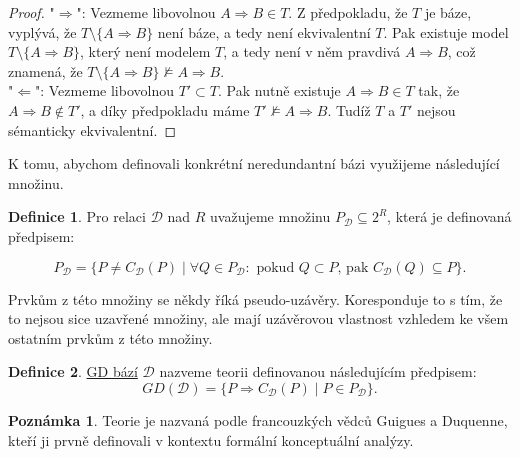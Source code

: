 \documentclass{article}
\theoremstyle {definition}
\newtheorem{definition}{Definice}
\newtheorem*{remark}{Poznámka}
\begin{document}
\begin{proof}
  "$\Rightarrow$": Vezmeme libovolnou $A \Rightarrow B \in T$. Z
  předpokladu, že $T$ je báze, vyplývá, že $T \setminus \{A
  \Rightarrow B \}$ není báze, a tedy není ekvivalentní $T$. Pak
  existuje model $T \setminus \{A \Rightarrow B \}$, který není
  modelem $T$, a tedy není v něm pravdivá $A\Rightarrow B$, což
  znamená, že $T \setminus \{A \Rightarrow B \} \not\models A
  \Rightarrow B$.\\
  
  "$\Leftarrow$": Vezmeme libovolnou $T' \subset T$. Pak nutně
  existuje $A \Rightarrow B \in T$ tak, že $A \Rightarrow B \notin
  T'$, a díky předpokladu máme $T' \not\models A \Rightarrow B$. Tudíž
  $T$ a $T'$ nejsou sémanticky ekvivalentní.
\end{proof}

K tomu, abychom definovali konkrétní neredundantní bázi využijeme
následující množinu.

\begin{definition}
  Pro relaci $\mathcal{D}$ nad $R$ uvažujeme množinu $P_{\mathcal{D}}
  \subseteq 2^R$, která je definovaná předpisem:
  
  $$P_{\mathcal{D}} = \{ P \neq C_{\mathcal{D}}(P) \mid \forall Q \in
  P_{\mathcal{D}}: \text{ pokud } Q \subset P \text{, pak }
  C_{\mathcal{D}}(Q) \subseteq P \}.$$
\end{definition}

Prvkům z této množiny se někdy říká pseudo-uzávěry. Koresponduje to s
tím, že to nejsou sice uzavřené množiny, ale mají uzávěrovou vlastnost
vzhledem ke všem ostatním prvkům z této množiny.

\begin {definition}
  \underline {GD bází} $\mathcal D$ nazveme teorii definovanou
  následujícím předpisem:
  $$GD(\mathcal D)= \{P \Rightarrow C_{\mathcal{D}}(P) \mid P \in
  P_{\mathcal{D}}\}.$$
\end {definition}

\begin {remark}
  Teorie je nazvaná podle francouzkých vědců Guigues a Duquenne, kteří
  ji prvně definovali v kontextu formální konceptuální analýzy.
\end {remark}
\end{document}

